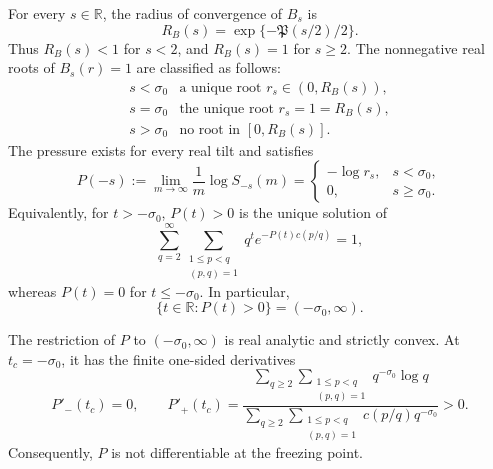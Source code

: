 \begin{proposition}
\label{thm:exact-negative-pressure}
\label{thm:all-real-pressure}
For every \(s\in\mathbb R\), the radius of convergence of \(B_s\) is
\begin{equation}
 R_B(s)=\exp\{-\mathfrak P(s/2)/2\}.
 \label{eq:Bs-radius}
\end{equation}
Thus \(R_B(s)<1\) for \(s<2\), and \(R_B(s)=1\) for \(s\ge2\).
The nonnegative real roots of \(B_s(r)=1\) are classified as follows:
\[
\begin{array}{c|c}
s<\sigma_0 & \text{a unique root }r_s\in(0,R_B(s)),\\
s=\sigma_0 & \text{the unique root }r_s=1=R_B(s),\\
s>\sigma_0 & \text{no root in }[0,R_B(s)].
\end{array}
\]
The pressure exists for every real tilt and satisfies
\begin{equation}
 P(-s):=\lim_{m\to\infty}\frac1m\log S_{-s}(m)
 =\begin{cases}
   -\log r_s,&s<\sigma_0,\\
   0,&s\ge\sigma_0.
  \end{cases}
 \label{eq:all-real-pressure}
\end{equation}
Equivalently, for \(t>-\sigma_0\), \(P(t)>0\) is the unique solution of
\begin{equation}
 \sum_{q=2}^{\infty}
 \sum_{\substack{1\le p<q\\(p,q)=1}}
 q^t e^{-P(t)c(p/q)}=1,
 \label{eq:exact-negative-pressure}
\end{equation}
whereas \(P(t)=0\) for \(t\le-\sigma_0\).  In particular,
\begin{equation}
 \{t\in\mathbb R:P(t)>0\}=(-\sigma_0,\infty).
 \label{eq:exact-zero-pressure-set}
\end{equation}

The restriction of \(P\) to \((-\sigma_0,\infty)\) is real analytic and
strictly convex.  At \(t_c=-\sigma_0\), it has the finite one-sided
derivatives
\begin{equation}
 P'_-(t_c)=0,
 \qquad
 P'_+(t_c)=
 \frac{\displaystyle
  \sum_{q\ge2}\sum_{\substack{1\le p<q\\(p,q)=1}}
       q^{-\sigma_0}\log q}
 {\displaystyle
  \sum_{q\ge2}\sum_{\substack{1\le p<q\\(p,q)=1}}
       c(p/q)q^{-\sigma_0}}>0.
 \label{eq:critical-pressure-slopes}
\end{equation}
Consequently, \(P\) is not differentiable at the freezing point.
\end{proposition}

